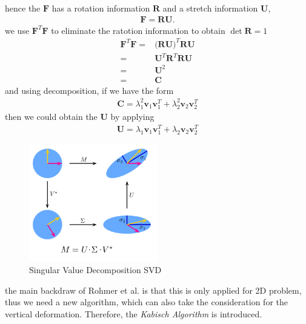 \documentclass{beamer}
\begin{document}

\begin{frame}
hence the $\mathbf{F}$ has a rotation information $\mathbf{R}$ and a stretch information $\mathbf{U}$,
\begin{align}
\mathbf{F}=\mathbf{R}\mathbf{U}.
\end{align}
we use $\mathbf{F}^T\mathbf{F}$ to eliminate the ratotion information to obtain $\det\mathbf{R}=1$ 
\begin{align}
\mathbf{F}^T\mathbf{F}=&
\bigl( \mathbf{R}\mathbf{U} \bigr) ^T\mathbf{R}\mathbf{U} \\
=&\mathbf{U}^T\mathbf{R}^T\mathbf{R}\mathbf{U} \\
=&\mathbf{U}^2 \\
=&\mathbf{C}
\end{align}
and using decomposition, if we have the form
\begin{align}
\mathbf{C} = \lambda_1^2\mathbf{v}_1\mathbf{v}_1^T+\lambda_2^2\mathbf{v}_2\mathbf{v}_2^T
\end{align} 
then we could obtain the $\mathbf{U}$ by applying
\begin{align}
\mathbf{U} = \lambda_1\mathbf{v}_1\mathbf{v}_1^T+\lambda_2\mathbf{v}_2\mathbf{v}_2^T
\label{eq:strech_tensor_diagonalized}
\end{align}
\end{frame}


\begin{frame}
\begin{figure}
\centering
\includegraphics[width=0.5\textwidth]{image//Singular_Value_Decomposition_svd.png}
\caption{Singular Value Decomposition SVD}
\end{figure}
the main backdraw of Rohmer et al. is that this is only applied for 2D problem, thus we need a new algorithm, which can also take the consideration for the vertical deformation. Therefore, the \emph{Kabisch Algorithm} is introduced.
\end{frame}
\end{document}
